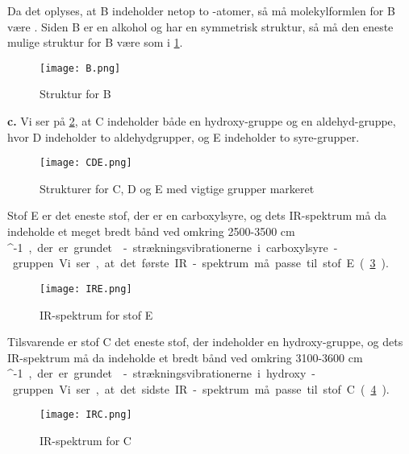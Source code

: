 \documentclass{report}
\begin{document}
Da det oplyses, at B indeholder netop to -atomer, så må molekylformlen for B være .
Siden B er en alkohol og har en symmetrisk struktur, så må den eneste mulige struktur for B være som i \cref{fig:B}.
\begin{figure}[H]
\begin{center}
  \texttt{[image: B.png]}
\end{center}
\caption{Struktur for B}
\label{fig:B}
\end{figure}
\noindent \textbf{c.}
Vi ser på \cref{fig:CDE}, at C indeholder både en hydroxy-gruppe og en aldehyd-gruppe, hvor D indeholder to aldehydgrupper, og E indeholder to syre-grupper.
\begin{figure}[H]
\begin{center}
  \texttt{[image: CDE.png]}
\end{center}
\caption{Strukturer for C, D og E med vigtige grupper markeret}
\label{fig:CDE}
\end{figure}
Stof E er det eneste stof, der er en carboxylsyre, og dets IR-spektrum må da indeholde et meget bredt bånd ved omkring 2500-3500 \;\unit{cm ^{-1}}, der er grundet -strækningsvibrationerne i carboxylsyre-gruppen.
Vi ser, at det første IR-spektrum må passe til stof E (\cref{fig:IRE}).
\begin{figure}[H]
\begin{center}
  \texttt{[image: IRE.png]}
\end{center}
\caption{IR-spektrum for stof E}
\label{fig:IRE}
\end{figure}
Tilsvarende er stof C det eneste stof, der indeholder en hydroxy-gruppe, og dets IR-spektrum må da indeholde et bredt bånd ved omkring 3100-3600 \;\unit{cm ^{-1}}, der er grundet -strækningsvibrationerne i hydroxy-gruppen.
Vi ser, at det sidste IR-spektrum må passe til stof C (\cref{fig:IRC}).
\begin{figure}[H]
\begin{center}
  \texttt{[image: IRC.png]}
\end{center}
\caption{IR-spektrum for C}
\label{fig:IRC}
\end{figure}
\end{document}
